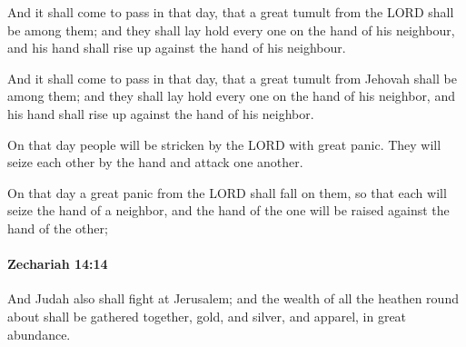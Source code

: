 			And it shall come to pass in that day, that a great tumult from the LORD shall be among them; and they shall lay hold every one on the hand of his neighbour, and his hand shall rise up against the hand of his neighbour.

			\begin{versebox}
					\item[BHS] 
					\item[LXX] 
					\item[ASV] And it shall come to pass in that day, that a great tumult from Jehovah shall be among them; and they shall lay hold every one on the hand of his neighbor, and his hand shall rise up against the hand of his neighbor.
					\item[NIV] On that day people will be stricken by the LORD with great panic. They will seize each other by the hand and attack one another.
					\item[NRSV] On that day a great panic from the LORD shall fall on them, so that each will seize the hand of a neighbor, and the hand of the one will be raised against the hand of the other;
			\end{versebox}

		\paragraph{Zechariah 14:14} %
			\label{ZECHARIAH-14-14}

			And Judah also shall fight at Jerusalem; and the wealth of all the heathen round about shall be gathered together, gold, and silver, and apparel, in great abundance.

